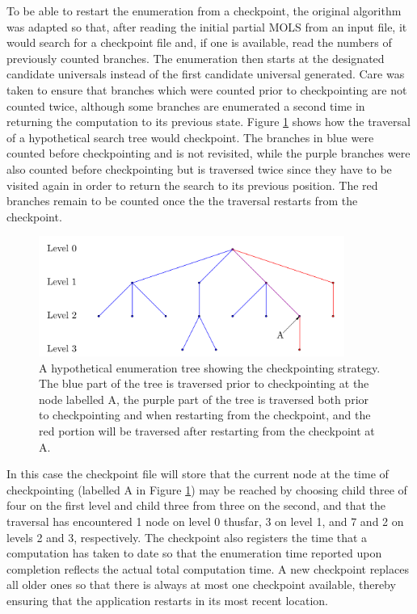 To be able to restart the enumeration from a checkpoint, the original algorithm was adapted so that, after reading the initial partial MOLS from an input file, it would search for a checkpoint file and, if one is available,  read the   numbers of previously counted branches. 
The enumeration then starts at the designated candidate universals instead of the first candidate universal generated. Care was taken to ensure that branches which were counted prior to checkpointing are not  counted twice, although some branches are enumerated a second time in  returning the computation to its previous state. 
Figure \ref{fig:checkpoint} shows how the  traversal of a hypothetical search tree would checkpoint. 
The branches in blue were counted   before checkpointing and is not revisited, while the purple branches were also counted before checkpointing but is traversed twice since they have to be visited again in order to return the search to its previous position. 
The red branches remain to be counted once the the traversal restarts from the checkpoint.\begin{figure}
\centering
\includegraphics[width=10cm]{images/checkpointing2}
\caption{A  hypothetical enumeration tree showing the checkpointing strategy. The blue part of the tree is traversed prior to checkpointing at the node labelled A, the purple part of the tree is traversed both prior to checkpointing and when restarting from the checkpoint, and the red portion will be traversed after restarting from the checkpoint at A.} \label{fig:checkpoint}
\end{figure} 
In this case the checkpoint file   will   store  that the current node  at the time of checkpointing (labelled A in Figure \ref{fig:checkpoint}) may be reached by choosing child three of four on the first level and child three from three on the second, and that the traversal has encountered 1 node  on level 0 thusfar, 3 on level 1, and 7 and 2 on levels 2  and 3, respectively. 
The checkpoint   also registers the time that a computation has taken to date so that the   enumeration time  reported upon completion reflects the  actual total computation time. A new checkpoint  replaces all older ones so that there is always at most  one checkpoint available, thereby ensuring that the application restarts in its most recent location.

